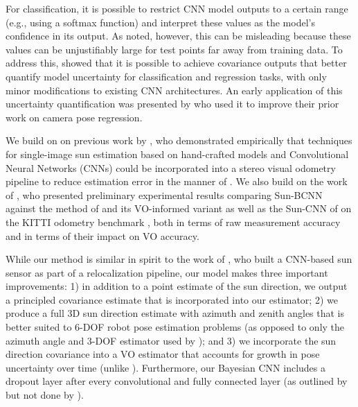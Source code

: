 For classification, it is possible to restrict CNN model outputs to a certain range (e.g., using a softmax function) and interpret these values as the model's confidence in its output. As \citet{Gal2016UncertaintyThesis} noted, however, this can be misleading because these  values can be unjustifiably large for test points far away from training data.  To address this, \citet{Gal2016-ny} showed that it is possible to achieve covariance outputs that better quantify model uncertainty for classification and regression tasks, with only minor modifications to existing CNN architectures. 
An early application of this uncertainty quantification was presented by \citet{Kendall2016-zf} who used it to improve their prior work \citep{Kendall2015-ew} on camera pose regression.

We build on on previous work by \citet{2017_Clement_Improving}, who demonstrated empirically that techniques for single-image sun estimation based on hand-crafted models \citep{Lalonde2011-jw} and Convolutional Neural Networks (CNNs) \citep{Ma2016-at} could be incorporated into a stereo visual odometry pipeline to reduce estimation error in the manner of \citet{Lambert2012-sn}.
We also build on the work of \citet{2017_Peretroukhin_Reducing}, who presented preliminary experimental results comparing Sun-BCNN against the method of \citet{Lalonde2011-jw} and its VO-informed variant \citep{2017_Clement_Improving} as well as the Sun-CNN of \citet{Ma2016-at} on the KITTI odometry benchmark \citep{Geiger2013-ky}, both in terms of raw measurement accuracy and in terms of their impact on VO accuracy.

While our method is similar in spirit to the work of \citet{Ma2016-at}, who built a CNN-based sun sensor as part of a relocalization pipeline, our model makes three important improvements: 1) in addition to a point estimate of the sun direction, we output a principled covariance estimate that is incorporated into our estimator; 2) we produce a full 3D sun direction estimate with azimuth and zenith angles that is better suited to 6-DOF robot pose estimation problems (as opposed to only the azimuth angle and 3-DOF estimator used by \citet{Ma2016-at}); and 3) we incorporate the sun direction covariance into a VO estimator that accounts for growth in pose uncertainty over time (unlike \citet{2017_Clement_Improving}). 
Furthermore, our Bayesian CNN includes a dropout layer after every convolutional and fully connected layer (as outlined by \citet{Gal2016-ny} but not done by \citet{Kendall2016-zf}).


